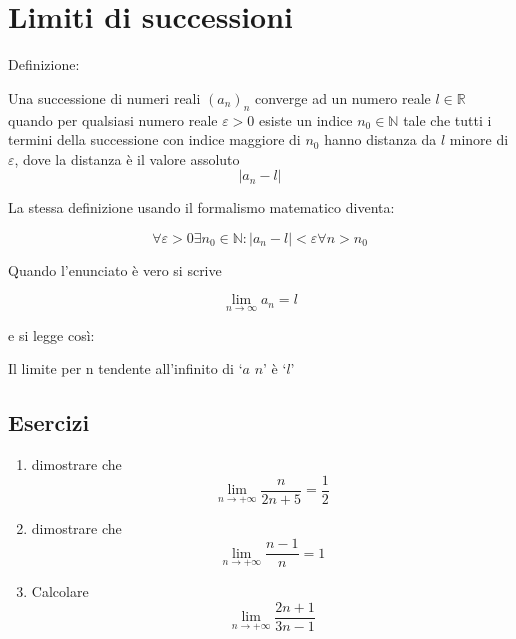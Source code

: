 \section{Limiti di successioni}\label{subsec:limiti:successioni}

Definizione:

Una successione di numeri reali $(a_n)_n$ converge ad un numero reale 
$l\in \mathbb{R}$ quando per qualsiasi numero reale
$\varepsilon > 0$ esiste un indice 
$n_0\in \mathbb{N}$ tale che tutti i termini della successione con indice maggiore di 
$n_0$ hanno distanza da $l$ minore di $\varepsilon$, dove la distanza è il valore assoluto
\[
\left| a_n-l \right|
\]


La stessa definizione usando il formalismo matematico diventa:

\[
\forall \varepsilon > 0  \exists n_0\in \mathbb{N} : \left|a_n-l\right| < \varepsilon
\forall n>n_0
\]

Quando l'enunciato è vero si scrive

\[
\lim_{n\to\infty}a_n = l
\]

e si legge così: 

Il limite per n tendente all'infinito di `$a$ $n$' è `$l$'

\subsection{Esercizi}

\begin{enumerate}




\item  dimostrare che  \label{lims_00}
\[
\lim_{n\to + \infty}\frac{n}{2n+5}=\frac{1}{2}
\]


\item  dimostrare che  \label{lims_01}
\[
\lim_{n\to + \infty}\frac{n-1}{n}=1
\]



\item Calcolare \label{lims_02}
\[
\lim_{n \to +\infty}\frac{2n+1}{3n-1}
\]


\end{enumerate}

\pagebreak

